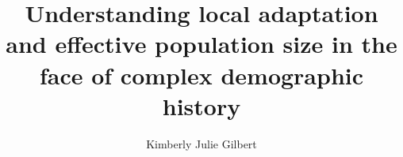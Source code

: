 \documentclass[
11pt         %
,oneside
,openright   %
]{mythesis}
\title{Understanding local adaptation and effective population size in the face of complex demographic history}
\author{Kimberly Julie Gilbert}
\begin{document}
\maketitle


%




  



\allcontents


\cleardoublepage
\mainbody








\formatbibliography



\formatappendices




\end{document}
